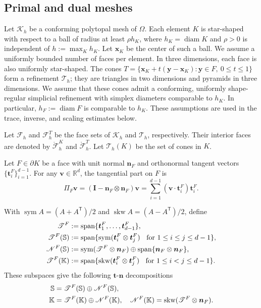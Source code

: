 \documentclass[review,hidelinks,onefignum,onetabnum]{siamart251216}
\newcommand{\sym}{\operatorname{sym}}
\newcommand{\skw}{\operatorname{skw}}
\newcommand{\AI}[1]{{\color{blue}#1}}
\begin{document}
\subsection{Primal and dual meshes}
\AI{Let $\mathcal K_h$ be a conforming polytopal mesh of $\Omega$.
Each element $K$ is star-shaped with respect to a ball of radius at least
$\rho h_K$, where $h_K=\operatorname{diam}K$ and $\rho>0$ is independent of
$h:=\max_K h_K$. Let $\boldsymbol x_K$ be the center of such a ball.
We assume a uniformly bounded number of faces per element. In three dimensions,
each face is also uniformly star-shaped. The cones
$T=\{\boldsymbol x_K+t(\boldsymbol y-\boldsymbol x_K):\boldsymbol y\in F,\ 0\leq t\leq1\}$ form a refinement $\mathcal T_h$;
they are triangles in two dimensions and pyramids in three dimensions.
We assume that these cones admit a conforming, uniformly shape-regular
simplicial refinement with simplex diameters comparable to $h_K$.
In particular, $h_F:=\operatorname{diam}F$ is comparable to $h_K$.
These assumptions are used in the trace, inverse, and scaling estimates below.}

Let $\mathcal F_h$ and $\mathcal F_h^T$ be the face sets of $\mathcal K_h$
and $\mathcal T_h$, respectively. Their interior faces are denoted by
$\mathring{\mathcal F}_h^K$ and $\mathring{\mathcal F}_h^T$.
Let $\mathcal T_h(K)$ be the set of cones in $K$.

Let $F \in \partial K$ be a face with unit normal $\boldsymbol{n}_F$ and orthonormal tangent vectors $\{\boldsymbol{t}_i^{F}\}_{i=1}^{d-1}$. For any $\boldsymbol{v}\in\mathbb{R}^d$, the tangential part on $F$ is
$$
\Pi_F \boldsymbol{v}=(\boldsymbol{I}-\boldsymbol{n}_F\otimes\boldsymbol{n}_F)\boldsymbol{v}
=\sum_{i=1}^{d-1}(\boldsymbol{v}\cdot\boldsymbol{t}_i^{F})\boldsymbol{t}_i^{F}.
$$

With $\sym A=(A+A^{\mathsf T})/2$ and $\skw A=(A-A^{\mathsf T})/2$, define
\begin{align*}
\mathscr T^F&:=\textrm{span}\{\boldsymbol{t}_1^F, \ldots, \boldsymbol{t}_{d-1}^F\}, \\
\mathscr T^F(\mathbb S)&:=\textrm{span}\{{\rm sym}(\boldsymbol{t}_i^F\otimes \boldsymbol{t}_j^F) \;\;\textrm{ for } 1\leq i\leq j\leq d-1\}, \\
\mathscr N^F(\mathbb S) &:= \sym(\mathscr T^F\otimes\boldsymbol{n}_F)\oplus {\rm span}\{\boldsymbol{n}_F\otimes\boldsymbol{n}_F\},\\
\mathscr T^F(\mathbb K)&:=\textrm{span}\{{\rm skw}(\boldsymbol{t}_i^F\otimes \boldsymbol{t}_j^F) \;\;\textrm{ for } 1\leq i< j\leq d-1\}.
\end{align*}
These subspaces give the following $\boldsymbol{t}$-$\boldsymbol{n}$ decompositions
\begin{align}\label{eq:decS}
\mathbb S&= \mathscr T^F(\mathbb S)\oplus \mathscr N^F(\mathbb S), \quad 
\\
\mathbb K&= \mathscr T^F(\mathbb K)\oplus \mathscr N^F(\mathbb K), \quad \mathscr N^F(\mathbb K)={\rm skw}(\mathscr T^F\otimes\boldsymbol{n}_F).
\end{align}
\end{document}
